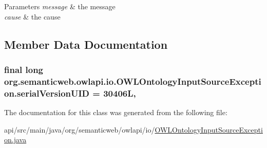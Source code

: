 \begin{DoxyParams}{Parameters}
{\em message} & the message \\
\hline
{\em cause} & the cause \\
\hline
\end{DoxyParams}


\subsection{Member Data Documentation}
\hypertarget{classorg_1_1semanticweb_1_1owlapi_1_1io_1_1_o_w_l_ontology_input_source_exception_a1bbedb2d49d0795526a0015e87bad39b}{
\subsubsection[{serial\-Version\-U\-I\-D}]{\setlength{\rightskip}{0pt plus 5cm}final long org.\-semanticweb.\-owlapi.\-io.\-O\-W\-L\-Ontology\-Input\-Source\-Exception.\-serial\-Version\-U\-I\-D = 30406\-L\hspace{0.3cm}{\ttfamily [static]}, {\ttfamily [private]}}}\label{classorg_1_1semanticweb_1_1owlapi_1_1io_1_1_o_w_l_ontology_input_source_exception_a1bbedb2d49d0795526a0015e87bad39b}


The documentation for this class was generated from the following file\-:\begin{DoxyCompactItemize}
\item 
api/src/main/java/org/semanticweb/owlapi/io/\hyperlink{_o_w_l_ontology_input_source_exception_8java}{O\-W\-L\-Ontology\-Input\-Source\-Exception.\-java}\end{DoxyCompactItemize}
